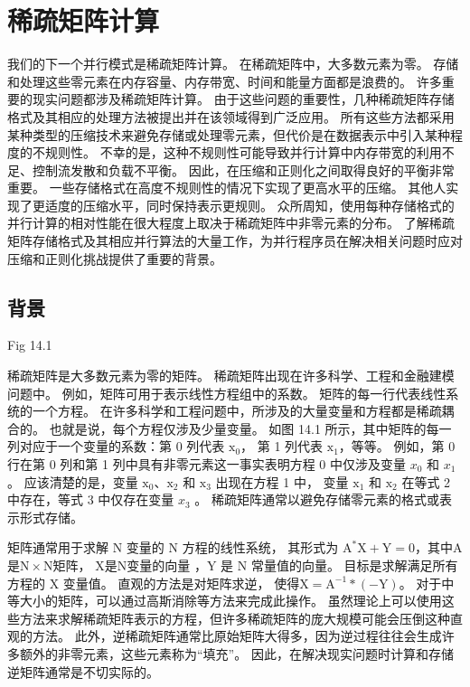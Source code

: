 \section{稀疏矩阵计算}
我们的下一个并行模式是稀疏矩阵计算。 在稀疏矩阵中，大多数元素为零。 
存储和处理这些零元素在内存容量、内存带宽、时间和能量方面都是浪费的。 许多重要的现实问题都涉及稀疏矩阵计算。 
由于这些问题的重要性，几种稀疏矩阵存储格式及其相应的处理方法被提出并在该领域得到广泛应用。 
所有这些方法都采用某种类型的压缩技术来避免存储或处理零元素，但代价是在数据表示中引入某种程度的不规则性。 
不幸的是，这种不规则性可能导致并行计算中内存带宽的利用不足、控制流发散和负载不平衡。 
因此，在压缩和正则化之间取得良好的平衡非常重要。 一些存储格式在高度不规则性的情况下实现了更高水平的压缩。 
其他人实现了更适度的压缩水平，同时保持表示更规则。 
众所周知，使用每种存储格式的并行计算的相对性能在很大程度上取决于稀疏矩阵中非零元素的分布。 
了解稀疏矩阵存储格式及其相应并行算法的大量工作，为并行程序员在解决相关问题时应对压缩和正则化挑战提供了重要的背景。

\subsection{背景}
{\color{red} Fig 14.1}

稀疏矩阵是大多数元素为零的矩阵。 稀疏矩阵出现在许多科学、工程和金融建模问题中。 例如，矩阵可用于表示线性方程组中的系数。 
矩阵的每一行代表线性系统的一个方程。 在许多科学和工程问题中，所涉及的大量变量和方程都是稀疏耦合的。 
也就是说，每个方程仅涉及少量变量。 
如图 14.1 所示，其中矩阵的每一列对应于一个变量的系数：第 0 列代表 $\mathrm{x}_{0}$，
第 1 列代表 $\mathrm{x}_{1 }$，等等。 
例如，第 0 行在第 0 列和第 1 列中具有非零元素这一事实表明方程 0 中仅涉及变量 $x_{0}$ 和 $x_{1}$ 。 
应该清楚的是，变量 $\mathrm{x}_{0}、\mathrm{x}_{2}$ 和 $\mathrm{x}_{3}$ 出现在方程 1 中，
变量 $\mathrm{x}_{1}$ 和 $\mathrm{x}_{2}$ 在等式 2 中存在，等式 3 中仅存在变量 $x_{3}$ 。 
稀疏矩阵通常以避免存储零元素的格式或表示形式存储。

矩阵通常用于求解 $\mathrm{N}$ 变量的 $\mathrm{N}$ 方程的线性系统，
其形式为 $\mathrm{A}^{*} \mathrm{X}+\mathrm{Y }=0$，其中$\mathrm{A}$是$\mathrm{N} \times \mathrm{N}$矩阵，
$\mathrm{X}$是$\mathrm{N}$变量的向量 ，$\mathrm{Y}$ 是 $\mathrm{N}$ 常量值的向量。 
目标是求解满足所有方程的 $\mathrm{X}$ 变量值。 直观的方法是对矩阵求逆，
使得$\mathrm{X}=\mathrm{A}^{-1} *(-\mathrm{Y})$。 对于中等大小的矩阵，可以通过高斯消除等方法来完成此操作。 
虽然理论上可以使用这些方法来求解稀疏矩阵表示的方程，但许多稀疏矩阵的庞大规模可能会压倒这种直观的方法。 
此外，逆稀疏矩阵通常比原始矩阵大得多，因为逆过程往往会生成许多额外的非零元素，这些元素称为“填充”。 
因此，在解决现实问题时计算和存储逆矩阵通常是不切实际的。


